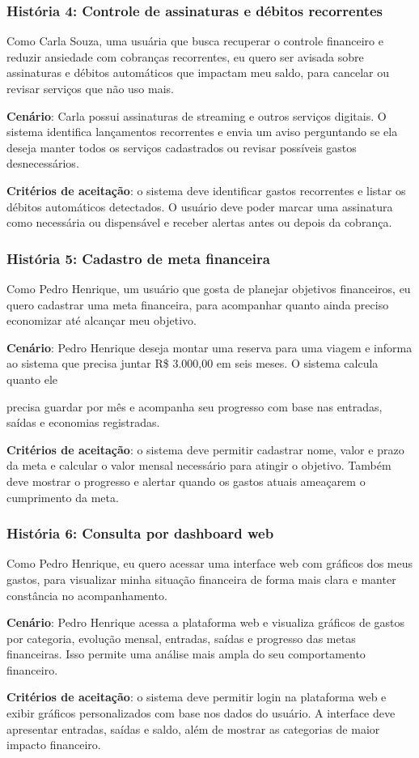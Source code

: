 \subsubsection{História 4: Controle de assinaturas e débitos recorrentes}

Como Carla Souza, uma usuária que busca recuperar o controle financeiro e reduzir ansiedade com cobranças recorrentes, eu quero ser avisada sobre assinaturas e débitos automáticos que impactam meu saldo, para cancelar ou revisar serviços que não uso mais.

\textbf{Cenário}: Carla possui assinaturas de streaming e outros serviços digitais. O sistema identifica lançamentos recorrentes e envia um aviso perguntando se ela deseja manter todos os serviços cadastrados ou revisar possíveis gastos desnecessários.

\textbf{Critérios de aceitação}: o sistema deve identificar gastos recorrentes e listar os débitos automáticos detectados. O usuário deve poder marcar uma assinatura como necessária ou dispensável e receber alertas antes ou depois da cobrança.

\subsubsection{História 5: Cadastro de meta financeira}

Como Pedro Henrique, um usuário que gosta de planejar objetivos financeiros, eu quero cadastrar uma meta financeira, para acompanhar quanto ainda preciso economizar até alcançar meu objetivo.

\textbf{Cenário}: Pedro Henrique deseja montar uma reserva para uma viagem e informa ao sistema que precisa juntar R\$ 3.000,00 em seis meses. O sistema calcula quanto ele

precisa guardar por mês e acompanha seu progresso com base nas entradas, saídas e economias registradas.

\textbf{Critérios de aceitação}: o sistema deve permitir cadastrar nome, valor e prazo da meta e calcular o valor mensal necessário para atingir o objetivo. Também deve mostrar o progresso e alertar quando os gastos atuais ameaçarem o cumprimento da meta.

\subsubsection{História 6: Consulta por dashboard web}

Como Pedro Henrique, eu quero acessar uma interface web com gráficos dos meus gastos, para visualizar minha situação financeira de forma mais clara e manter constância no acompanhamento.

\textbf{Cenário}: Pedro Henrique acessa a plataforma web e visualiza gráficos de gastos por categoria, evolução mensal, entradas, saídas e progresso das metas financeiras. Isso permite uma análise mais ampla do seu comportamento financeiro.

\textbf{Critérios de aceitação}: o sistema deve permitir login na plataforma web e exibir gráficos personalizados com base nos dados do usuário. A interface deve apresentar entradas, saídas e saldo, além de mostrar as categorias de maior impacto financeiro.
